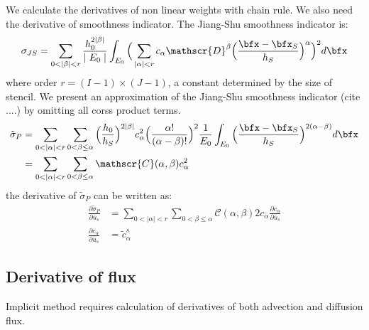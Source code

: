 We calculate the derivatives of non linear weights with chain rule. 
We also need the derivative of smoothness indicator.
The Jiang-Shu smoothness indicator is:
\begin{equation}\label{eq:JiangShuSmoothnessInd}
		  \sigma_{JS} = \sum_{0 < \mid \beta \mid < r}\frac{h_0^{2\mid \beta \mid}}{\mid E_0 \mid} \int_{E_0} 
		  \Big ( \sum_{\mid \alpha \mid < r} c_{\alpha} \mathscr{D}^\beta \Big( \frac{\bfx - \bfx_S}{h_S}  \Big)^\alpha \Big )^2
		  d\bfx
\end{equation}
where order $r = (I-1) \times(J-1)$, a constant determined by the size of stencil.
We present an approximation of the Jiang-Shu smoothness indicator (cite ....) by 
omitting all corss product terms.
\begin{equation}\label{eq:PolynSmoothnessInd}
		  \begin{aligned}
					 \tilde \sigma_P &= \sum_{0 < \mid \alpha \mid < r} \sum_{0<\beta \leq \alpha}  
		  \Big( \frac{h_0}{h_S} \Big)^{2\mid \beta \mid} c^2_{\alpha} \Big(\frac{\alpha !}{(\alpha - \beta)!} \Big)^2
		  \frac{1}{E_0}\int_{E_0}\Big( \frac{\bfx - \bfx_S}{h_S} \Big)^{2(\alpha - \beta)}d\bfx \\
					 &= \sum_{0 < \mid \alpha \mid < r} 
					 \sum_{0<\beta\leq \alpha} \mathscr{C} (\alpha, \beta) c^2_{\alpha}
		  \end{aligned}
\end{equation}
the derivative of $\tilde \sigma_P$ can be written as:
\begin{equation}\label{eq:derivative_c_alpha}
		 \begin{aligned}
					\frac{\partial \tilde \sigma_P}{\partial \bar u_s} &=   \sum_{0 < \mid \alpha \mid < r} 
					 \sum_{0<\beta\leq \alpha} \mathscr{C} (\alpha, \beta) 2c_{\alpha}\frac{\partial c_{\alpha}}{\partial \bar u_s}\\
					 \frac{\partial c_\alpha}{\partial \bar u_s} &= \tilde c^s_{\alpha}
		 \end{aligned}
\end{equation}

\subsection{Derivative of flux}
Implicit method requires calculation of derivatives of both advection and diffusion flux.

